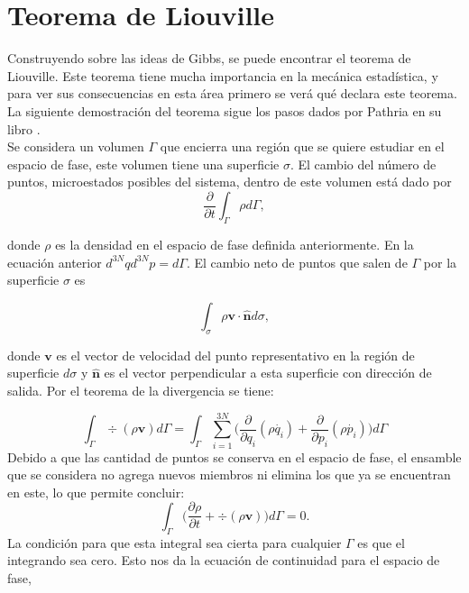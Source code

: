 \section{Teorema de Liouville }
Construyendo sobre las ideas de Gibbs, se puede encontrar el teorema de Liouville. Este teorema tiene mucha importancia en la mecánica estadística, y para ver sus consecuencias en esta área primero se verá qué declara este teorema. La siguiente demostración del teorema sigue los pasos dados por Pathria en su libro \cite{PathriaStat}. 
\\
Se considera un volumen $\Gamma$ que encierra una región que se quiere estudiar en el espacio de fase,  este volumen tiene una superficie $\sigma$. El cambio del número de puntos, microestados posibles del sistema, dentro de este volumen está dado por 
\begin{equation}
\frac{\partial}{\partial t} \int_{\Gamma} \rho d\Gamma,
\end{equation}

donde $\rho$ es la densidad en el espacio de fase definida anteriormente. En la ecuación anterior $d^{3N}q d^{3N}p=d\Gamma$. 
El cambio neto de puntos que salen de $\Gamma$ por la superficie $\sigma$ es

\begin{equation}
\int_{\sigma} \rho \mathbf{v \cdot \hat{n}} d\sigma,
\end{equation}

donde $\mathbf{v}$ es el vector de velocidad del punto representativo en la región de superficie $d\sigma$ y $\mathbf{\hat{n}}$ es el vector perpendicular a esta superficie con dirección de salida. Por el teorema de la divergencia se tiene:

\begin{equation}
\int_{\Gamma} \div{ ( \rho\mathbf{v} ) } d\Gamma = \int_{\Gamma} \sum_{i=1}^{3N} \Big( \frac{\partial}{\partial q_{i}}(\rho \dot{q_{i}})+ \frac{\partial}{\partial p_{i}} (\rho \dot{p_{i}}) \Big) d\Gamma
\end{equation}
Debido a que las cantidad de puntos se conserva en el espacio de fase, el ensamble que se considera no agrega nuevos miembros ni elimina los que ya se encuentran en este, lo que permite concluir:
\begin{equation}
 \int_{\Gamma} \Big( \frac{\partial \rho}{\partial t} + \div{ ( \rho\mathbf{v} ) } \Big) d\Gamma =0.
\end{equation}
La condición para que esta integral sea cierta para cualquier $\Gamma$ es que el integrando sea cero. Esto nos da la ecuación de continuidad para el espacio de fase,

